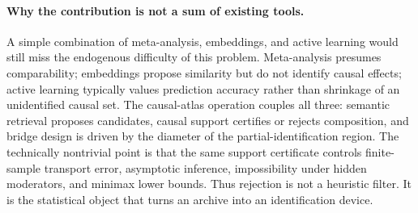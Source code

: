 \documentclass[11pt]{article}
\numberwithin{equation}{section}
\newcommand{\1}{\mathbf 1}
\begin{document}
\paragraph{Why the contribution is not a sum of existing tools.}
A simple combination of meta-analysis, embeddings, and active learning would still miss the endogenous difficulty of this problem.  Meta-analysis presumes comparability; embeddings propose similarity but do not identify causal effects; active learning typically values prediction accuracy rather than shrinkage of an unidentified causal set.  The causal-atlas operation couples all three: semantic retrieval proposes candidates, causal support certifies or rejects composition, and bridge design is driven by the diameter of the partial-identification region.  The technically nontrivial point is that the same support certificate controls finite-sample transport error, asymptotic inference, impossibility under hidden moderators, and minimax lower bounds.  Thus rejection is not a heuristic filter.  It is the statistical object that turns an archive into an identification device.
\end{document}
